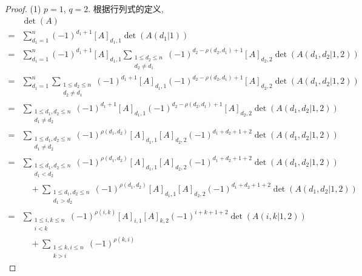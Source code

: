 \documentclass[%
    UTF8,%
    fontset=none,%
    punct=kaiming,%
    zihao=-4,%
    a4paper,%
    oneside,%
]{ctexbook}
\renewcommand*{\leq}{\leqslant}
\begin{document}
\begin{proof}
    (1)
    \(p = 1\), \(q = 2\).
    根据行列式的定义,
    \begin{align*}
             & \det {(A)}
        \\
        = {} &
        \sum_{d_1 = 1}^{n} {(-1)^{d_1+1} [A]_{d_1,1}
        \det {(A(d_1|1))}}
        \\
        = {} &
        \sum_{d_1 = 1}^{n} {(-1)^{d_1+1} [A]_{d_1,1}
        \sum_{\substack{1 \leq d_2 \leq n     \\d_2 \neq d_1}}
        {(-1)^{d_2 - \rho(d_2,d_1) + 1} [A]_{d_2,2}
            \det {(A(d_1,d_2|1,2))}}}
        \\
        = {} &
        \sum_{d_1 = 1}^{n}
        {\sum_{\substack{1 \leq d_2 \leq n    \\d_2 \neq d_1}}
        {(-1)^{d_1+1} [A]_{d_1,1}
            (-1)^{d_2 - \rho(d_2,d_1) + 1} [A]_{d_2,2}
            \det {(A(d_1,d_2|1,2))}}}
        \\
        = {} &
        \sum_{\substack{1 \leq d_1,d_2 \leq n \\d_1 \neq d_2}}
        {(-1)^{d_1+1} [A]_{d_1,1}
            (-1)^{d_2 - \rho(d_2,d_1) + 1} [A]_{d_2,2}
            \det {(A(d_1,d_2|1,2))}}
        \\
        = {} &
        \sum_{\substack{1 \leq d_1,d_2 \leq n \\d_1 \neq d_2}}
        {(-1)^{\rho(d_1,d_2)}
                [A]_{d_1,1} [A]_{d_2,2}
            (-1)^{d_1+d_2+1+2}
            \det {(A(d_1,d_2|1,2))}}
        \\
        = {} &
        \sum_{\substack{1 \leq d_1,d_2 \leq n \\d_1 < d_2}}
        {(-1)^{\rho(d_1,d_2)}
                [A]_{d_1,1} [A]_{d_2,2}
            (-1)^{d_1+d_2+1+2}
            \det {(A(d_1,d_2|1,2))}}
        \\
             & \quad +
        \sum_{\substack{1 \leq d_1,d_2 \leq n \\d_1 > d_2}}
        {(-1)^{\rho(d_1,d_2)}
                [A]_{d_1,1} [A]_{d_2,2}
            (-1)^{d_1+d_2+1+2}
            \det {(A(d_1,d_2|1,2))}}
        \\
        = {} &
        \sum_{\substack{1 \leq i,k \leq n     \\i < k}}
        {(-1)^{\rho(i,k)}
                [A]_{i,1} [A]_{k,2}
            (-1)^{i+k+1+2}
            \det {(A(i,k|1,2))}}
        \\
             & \quad +
        \sum_{\substack{1 \leq k,i \leq n     \\k > i}}
        {(-1)^{\rho(k,i)}
}
\end{align*}
\end{proof}
\end{document}
